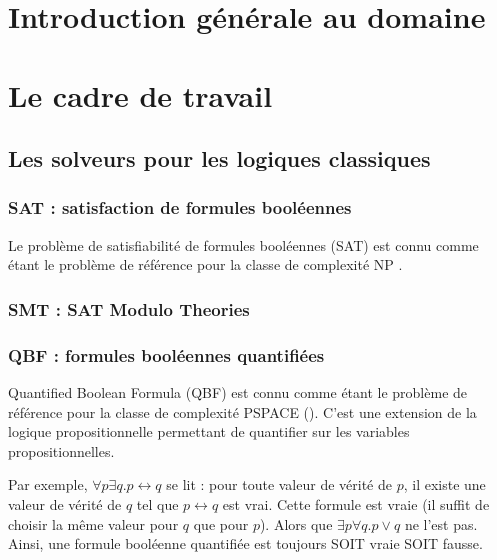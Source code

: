 
\section{Introduction générale au domaine}


\section{Le cadre de travail}

\subsection{Les solveurs pour les logiques classiques}

\subsubsection{SAT : satisfaction de formules booléennes}

Le problème de satisfiabilité de formules booléennes (SAT) est connu comme étant le problème de référence pour la classe de complexité NP \cite{DBLP:conf/stoc/Cook71}.

\subsubsection{SMT : SAT Modulo Theories}


\subsubsection{QBF : formules booléennes quantifiées}
Quantified Boolean Formula (QBF) est connu comme étant le problème de référence pour la classe de complexité PSPACE (\cite{Stockmeyer:1973:WPR:800125.804029}). C'est une extension de la logique propositionnelle permettant de quantifier sur les variables propositionnelles. 

Par exemple, $\forall p \exists q.p \leftrightarrow q$ se lit : pour toute valeur de vérité de $p$, il existe une valeur de vérité de $q$ tel que $p \leftrightarrow q$ est vrai. Cette formule est vraie (il suffit de choisir la même valeur pour $q$ que pour $p$). Alors que  $\exists p \forall q.p \lor q$ ne l'est pas. Ainsi, une formule booléenne quantifiée est toujours SOIT vraie SOIT fausse. 

